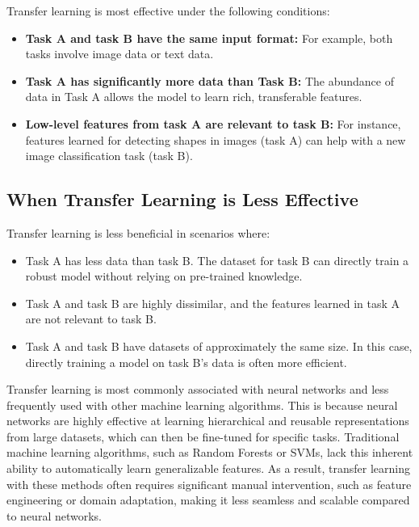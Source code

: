 \documentclass[12pt,openany]{book}
\begin{document}
Transfer learning is most effective under the following conditions:
\begin{itemize}
    \item \textbf{Task A and task B have the same input format:} For example, both tasks involve image data or text data.
    \item \textbf{Task A has significantly more data than Task B:} The abundance of data in Task A allows the model to learn rich, transferable features.
    \item \textbf{Low-level features from task A are relevant to task B:} For instance, features learned for detecting shapes in images (task A) can help with a new image classification task (task B).
\end{itemize}


\subsection{When Transfer Learning is Less Effective}

Transfer learning is less beneficial in scenarios where:
\begin{itemize}
    \item Task A has less data than task B. The dataset for task B can directly train a robust model without relying on pre-trained knowledge.
    \item Task A and task B are highly dissimilar, and the features learned in task A are not relevant to task B.
    \item Task A and task B have datasets of approximately the same size. In this case, directly training a model on task B’s data is often more efficient.
\end{itemize}

\vspace{0.5cm}

\begin{notebox}
Transfer learning is most commonly associated with neural networks and less frequently used with other machine learning algorithms. This is because neural networks are highly effective at learning hierarchical and reusable representations from large datasets, which can then be fine-tuned for specific tasks. Traditional machine learning algorithms, such as Random Forests or SVMs, lack this inherent ability to automatically learn generalizable features. As a result, transfer learning with these methods often requires significant manual intervention, such as feature engineering or domain adaptation, making it less seamless and scalable compared to neural networks.
\end{notebox}
\end{document}
